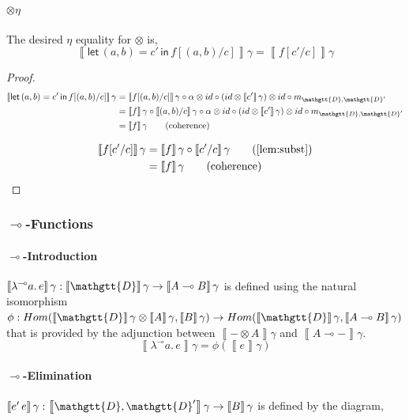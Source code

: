 \documentclass[acmsmall,nonacm]{acmart}
\renewcommand{\Delta}{\mathgtt{D}}
\newcommand{\sem}[1]{\left\llbracket{#1}\right\rrbracket}
\newcommand{\semg}[1]{\sem{#1}\gamma}
\newcommand{\lto}{\multimap}
\newcommand{\letin}[3]{\mathsf{let}\, #1 = #2 \, \mathsf{in}\, #3}
\newcommand{\lamblto}[2]{\lambda^{{\lto}} #1.\, #2}
\newcommand{\applto}[2]{#1 \, #2}
\begin{document}
\paragraph{$\otimes\eta$}
The desired $\eta$ equality for $\otimes$ is,
\[
  \semg{\letin {(a,b)} {c'} {f[(a,b)/c]}} = \semg{f[c'/c]}
\]
\begin{proof}
\begin{align*}
  \semg{\letin {(a,b)} {c'} {f[(a,b)/c]}}
  & = \semg{f[(a,b)/c]} \circ \alpha \otimes id \circ (id \otimes \semg{c'}) \otimes id \circ m_{\Delta,\Delta'} \\
  & = \semg{f} \circ \semg{(a,b)/c} \circ \alpha \otimes id \circ (id \otimes \semg{c'}) \otimes id \circ m_{\Delta,\Delta'} \\
  & = \semg{f} \tag{coherence}
\end{align*}

\begin{align*}
  \semg{f[c'/c]}
  &= \semg{f} \circ \semg{c'/c} \tag{\cref{lem:subst}} \\
  &= \semg{f} \tag{coherence}
\end{align*}
\end{proof}


\subsubsection{$\lto$-Functions}
\paragraph{$\lto$-Introduction}
$\semg{\lamblto a e} : \semg{\Delta} \to \semg{A \lto B}$ is defined using the
natural isomorphism
$\phi : Hom(\semg{\Delta} \otimes \semg{A}, \semg{B}) \to Hom(\semg{\Delta}, \semg{A \lto B})$
that is provided by the adjunction between $\semg{- \otimes A}$ and $\semg{A \lto -}$.
\[
\semg{\lamblto a e} = \phi\left( \semg{e} \right)
\]
\paragraph{$\lto$-Elimination}
$\semg{\applto {e'} {e}} : \semg{\Delta,\Delta'} \to \semg{B}$ is defined by the
diagram,

\begin{center}
\end{center}
\end{document}
